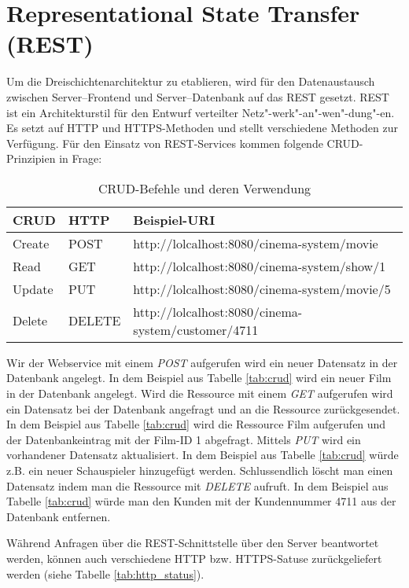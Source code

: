 \section{Representational State Transfer (REST)}
\label{sec:rest}
Um die Dreischichtenarchitektur zu etablieren, wird für den Datenaustausch zwischen Server--Frontend und Server--Datenbank auf das  \ac{REST} gesetzt. \ac{REST} ist ein Architekturstil für den Entwurf verteilter Netz"-werk"-an"-wen"-dung"-en. Es setzt auf \ac{HTTP} und \ac{HTTPS}-Methoden und stellt verschiedene Methoden zur Verfügung. Für den Einsatz von \ac{REST}-Services kommen folgende CRUD-Prinzipien in Frage:

\begin{table}
\begin{tabular}{ l| l | l }
	CRUD & HTTP & Beispiel-URI \\
	\hline
	Create & POST & http://lolcalhost:8080/cinema-system/movie \\ 
	Read & GET & http://lolcalhost:8080/cinema-system/show/1 \\ 
	Update & PUT & http://lolcalhost:8080/cinema-system/movie/5\\ 
	Delete & DELETE & http://lolcalhost:8080/cinema-system/customer/4711\\ 
\end{tabular}
\caption{CRUD-Befehle und deren Verwendung}
\label{tab:crud}
\end{table} 

Wir der Webservice mit einem \textit{POST} aufgerufen wird ein neuer Datensatz in der Datenbank angelegt. In dem Beispiel aus Tabelle \vref{tab:crud} wird ein neuer Film in der Datenbank angelegt. Wird die Ressource mit einem \textit{GET} aufgerufen wird ein Datensatz bei der Datenbank angefragt und an die Ressource zurückgesendet. In dem Beispiel aus Tabelle \vref{tab:crud} wird die Ressource Film aufgerufen und der Datenbankeintrag mit der Film-ID 1 abgefragt. Mittels \textit{PUT} wird ein vorhandener Datensatz aktualisiert. In dem Beispiel aus Tabelle \vref{tab:crud} würde z.B. ein neuer Schauspieler hinzugefügt werden. Schlussendlich löscht man einen Datensatz indem man die Ressource mit \textit{DELETE} aufruft. In dem Beispiel aus Tabelle  \vref{tab:crud} würde man den Kunden mit der Kundennummer 4711 aus der Datenbank entfernen.  

Während Anfragen über die REST-Schnittstelle über den Server beantwortet werden, können auch verschiedene HTTP bzw. HTTPS-Satuse zurückgeliefert werden (siehe Tabelle \vref{tab:http_status}). 


